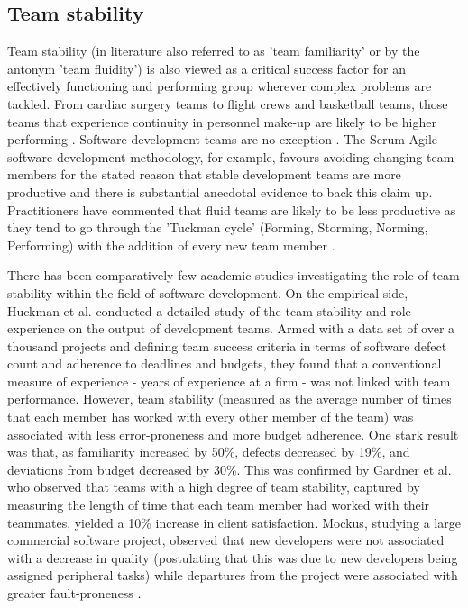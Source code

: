\subsection{Team stability}
Team stability (in literature also referred to as  'team familiarity' or by the antonym 'team fluidity') is also viewed as a critical success factor for an effectively functioning and performing group wherever complex problems are tackled. From cardiac surgery teams to flight crews and basketball teams, those teams that experience continuity in personnel make-up are likely to be higher performing \citep{carthey2001human, akgun2002antecedents, yeh2005influences, wiegmann2010improving, huckman2013hidden, joshi2018should}. Software development teams are no exception \citep{bao2017will}. The Scrum Agile software development methodology, for example, favours avoiding changing team members for the stated reason that stable development teams are more productive \citep{deemer2010scrum} and there is substantial anecdotal evidence to back this claim up. Practitioners have commented that fluid teams are likely to be less productive as they tend to go through the 'Tuckman cycle' (Forming, Storming, Norming, Performing) with the addition of every new team member \citep{tuckman1965developmental, linders2011establishing}.

There has been comparatively few academic studies investigating the role of team stability within the field of software development. On the empirical side, Huckman et al. \citep{huckman2009team} conducted a detailed study of the team stability and role experience on the output of development teams. Armed with a data set of over a thousand projects and defining team success criteria in terms of software defect count and adherence to deadlines and budgets,  they found that a conventional measure of experience - years of experience at a firm - was not linked with team performance. However, team stability (measured as the average number of times that each member has worked with every other member of the team) was associated with less error-proneness and more budget adherence. One stark result was that, as familiarity increased by 50\%, defects decreased by 19\%, and deviations from budget decreased by 30\%. This was confirmed by Gardner et al. \citep{gardner2012dynamically} who observed that teams with a high degree of team stability, captured by measuring the length of time that each team member had worked with their teammates, yielded a 10\% increase in client satisfaction. Mockus, studying a large commercial software project, observed that new developers were not associated with a decrease in quality (postulating that this was due to new developers being assigned peripheral tasks) while departures from the project were associated with greater fault-proneness \citep{mockus2010organizational}.
 
